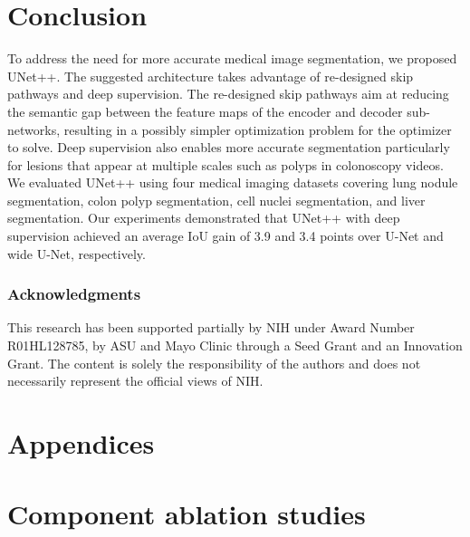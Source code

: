 \documentclass[runningheads]{llncs}
\begin{document}
\section{Conclusion}
\label{sec:conclusion}

To address the need for more accurate medical image segmentation, we proposed UNet++. The suggested architecture takes advantage of re-designed skip pathways and deep supervision. The re-designed skip pathways aim at reducing the semantic gap between the feature maps of the encoder and decoder sub-networks, resulting in a possibly simpler optimization problem for the optimizer to solve. Deep supervision also enables more accurate segmentation particularly for lesions that  appear at multiple scales such as polyps in colonoscopy videos. We evaluated UNet++ using four medical imaging datasets covering lung nodule segmentation, colon polyp segmentation, cell nuclei segmentation, and liver segmentation. Our experiments demonstrated that UNet++ with deep supervision achieved an average IoU gain of 3.9 and 3.4 points over U-Net and wide U-Net, respectively.



\subsubsection*{Acknowledgments}

This research has been supported partially by NIH under Award Number R01HL128785, by ASU and Mayo Clinic through a Seed Grant and an Innovation Grant. The content is solely the responsibility of the authors and does not necessarily represent the official views of NIH.

{\small


}

\iffalse



\newpage

\appendix

\section*{Appendices}

\section{Component ablation studies}
\label{sec:component_study}
\end{document}
